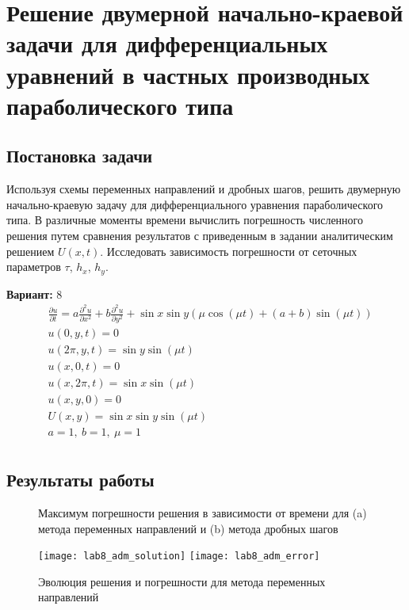 \section{Решение двумерной начально-краевой задачи для дифференциальных уравнений в частных производных параболического типа}

\subsection{Постановка задачи}
Используя схемы переменных направлений и дробных шагов, решить двумерную начально-краевую задачу для дифференциального уравнения параболического типа. В различные моменты времени вычислить погрешность численного решения путем сравнения результатов с приведенным в задании аналитическим решением $U(x, t)$. Исследовать зависимость погрешности от сеточных параметров $\tau$, $h_x$, $h_y$.

{\bfseries Вариант:} 8
\begin{align*} 
& \frac{\partial u}{\partial t} = a \frac{\partial^2 u}{\partial x^2} + b \frac{\partial^2 u}{\partial y^2} + \sin x \sin y (\mu \cos(\mu t) + (a + b) \sin(\mu t)) \\
& u(0, y, t) = 0 \\
& u(2 \pi, y, t) = \sin y \sin(\mu t) \\
& u(x, 0, t) = 0 \\
& u(x, 2 \pi, t) = \sin x \sin(\mu t)\\
& u(x, y, 0) = 0 \\
& U(x, y) = \sin x \sin y \sin(\mu t) \\
& a = 1,\ b = 1,\ \mu = 1 \\
\end{align*}

\pagebreak

\subsection{Результаты работы}
\begin{figure}[h!]
\centering
{}\hfill
{}
\caption{Максимум погрешности решения в зависимости от времени для (a) метода переменных направлений и (b) метода дробных шагов}
\end{figure}

\vspace{24pt}

\begin{figure}[h!]
\centering
\texttt{[image: lab8\_adm\_solution]}\hfill
\texttt{[image: lab8\_adm\_error]}
\caption{Эволюция решения и погрешности для метода переменных направлений}
\end{figure}

